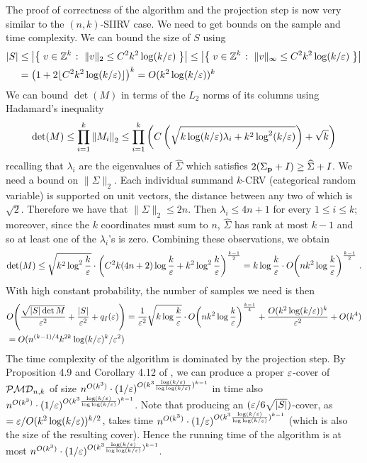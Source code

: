 The proof of correctness of the algorithm and the projection step is now very similar to the $(n,k)$-SIIRV case. We need to get bounds on the sample and time complexity.
We can bound the size of $S$ using
\begin{align*}
|S| & \leq \abs{\setOfSuchThat{ v\in \Z^k }{ \|v\|_2 \leq  C^2 k^2 \log(k/\eps) }} 
\leq \abs{\setOfSuchThat{ v\in \Z^k }{ \|v\|_\infty \leq  C^2 k^2 \log(k/\eps) }} \\
&= \left(1+2\lfloor C^2 k^2 \log(k/\eps)\rfloor \right)^k  
 = O(k^2\log(k/\eps))^k
\end{align*}
We can bound $\det(M)$ in terms of the $L_2$ norms of its columns using Hadamard's inequality
\[
  \det(M) \leq \prod_{i=1}^k \normtwo{M_i} \leq \prod_{i=1}^k \left( C \left(\sqrt{k \log(k/\eps)\lambda_i+k^2\log^2(k/\eps)}\right) + \sqrt{k} \right)
\]
recalling that $\lambda_i$ are the eigenvalues of $\widehat{\Sigma}$ which satisfies $2(\Sigma_\q+I) \geq \widehat{\Sigma}+I$.
 We need a bound on $\|\Sigma\|_2$. Each individual summand $k$-CRV (categorical random variable) is supported on unit vectors, the distance between any two of which is $\sqrt{2}$. Therefore we have that $\|\Sigma\|_2 \leq 2n$. Then $\lambda_i \leq 4n+1$ for every $1\leq i\leq k$; moreover, since the $k$ coordinates must sum to $n$, $\widehat{\Sigma}$ has rank at most $k-1$ and so at least one of the $\lambda_i$'s is zero. Combining these observations, we obtain
\[
    \det(M) \leq \sqrt{k^2\log^2\frac{k}{\eps}}\cdot \left(C^2 k(4n+2) \log\frac{k}{\eps} + k^2\log^2\frac{k}{\eps}\right)^{\frac{k-1}{2}} = k\log\frac{k}{\eps}\cdot \bigO{nk^2 \log\frac{k}{\eps}}^{\frac{k-1}{2}} \; .
\]
With high constant probability, the number of samples we need is then
 \begin{align*}
 & \bigO{ \frac{\sqrt{\abs{S}\det{M}}}{\eps^2} + \frac{\abs{S}}{\eps^2} + q_I(\eps)  } = 
  \frac{1}{\eps^2}\sqrt{k\log\frac{k}{\eps}}\cdot \bigO{nk^2 \log\frac{k}{\eps}}^{\frac{k-1}{4}} + \frac{O(k^2\log(k/\eps))^{k}}{\eps^2} + O(k^4) \\
 &= O(n^{(k-1)/4} k^{2k} \log(k/\eps)^k/\eps^2)
 \end{align*}
 The time complexity of the algorithm is dominated by the projection step. By Proposition 4.9 and Corollary 4.12 of \cite{DKS:15c}, we can produce a proper
 $\eps$-cover of $\classpmd[n]{k}$ of size $n^{O(k^3)} \cdot (1/\eps)^{O(k^3\frac{\log(k/\eps)}{\log\log(k/\eps)})^{k-1}}$ in time also $n^{O(k^3)} \cdot (1/\eps)^{O(k^3\frac{\log(k/\eps)}{\log\log(k/\eps)})^{k-1}}$. Note that producing an $(\eps/6\sqrt{|S|})$-cover, as $=\eps/O(k^2\log(k/\eps))^{k/2}$, takes time $n^{O(k^3)} \cdot (1/\eps)^{O(k^3\frac{\log(k/\eps)}{\log\log(k/\eps)})^{k-1}}$ (which is also the size of the resulting cover). Hence the running time of the algorithm is at most $n^{O(k^3)} \cdot (1/\eps)^{O(k^3\frac{\log(k/\eps)}{\log\log(k/\eps)})^{k-1}}$.

